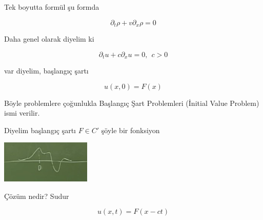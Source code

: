 \documentclass[12pt,fleqn]{article}\usepackage{../../common}
\begin{document}
Tek boyutta formül şu formda

$$ \partial_t \rho + v \partial_x \rho = 0 $$

Daha genel olarak diyelim ki 

$$ \partial_t u + c\partial_x u = 0, \ \ c>0 $$

var diyelim, başlangıç şartı

$$ u(x,0) = F(x) $$

Böyle problemlere çoğunlukla Başlangıç Şart Problemleri (İnitial Value
Problem) ismi verilir. 

Diyelim başlangıç şartı $F \in C'$  şöyle bir fonksiyon

\includegraphics[height=2cm]{1_3.png}

Çözüm nedir? Sudur 

$$ u(x,t) = F(x-ct) $$
\end{document}
